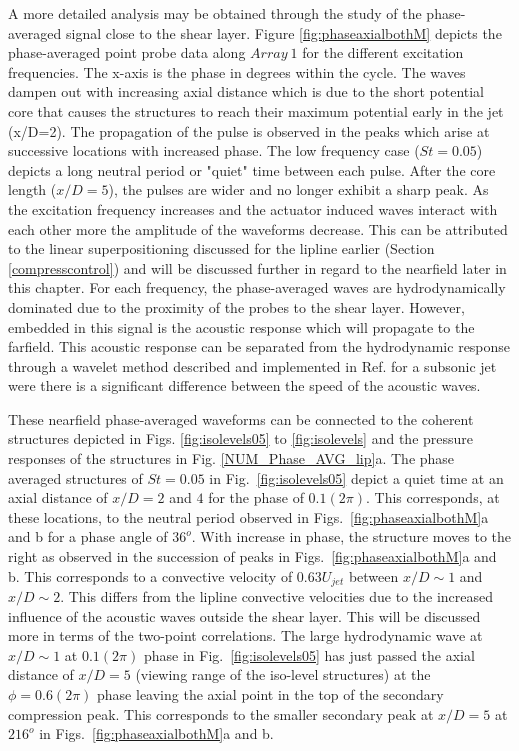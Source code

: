 \documentclass[english]{aiaa-tc}
\begin{document}
A more detailed analysis may be obtained through the study of the phase-averaged signal close to the shear layer.
Figure \ref{fig:phaseaxialbothM} depicts the phase-averaged point probe data along $Array~1$ for the different excitation frequencies. The x-axis is the phase in degrees within the cycle. The waves dampen out with increasing axial distance which is due to the short potential core that causes the structures to reach their maximum potential early in the jet (x/D=2). %
The propagation of the pulse is observed in the peaks which arise at
successive locations with increased phase. The low frequency case
($St=0.05$) depicts a long neutral period or "quiet" time between each
pulse. After the core length ($x/D=5$), the pulses are wider and no
longer exhibit a sharp peak.
As the excitation frequency increases and the actuator induced waves interact with each other more the amplitude of the waveforms decrease. This can be attributed to the linear superpositioning discussed for the lipline earlier (Section \ref{compresscontrol}) and will be discussed further in regard to the nearfield later in this chapter. 
For each frequency, the phase-averaged waves are hydrodynamically dominated due to the proximity of the probes to the shear layer. However, embedded in this signal is the acoustic response which will propagate to the farfield. This acoustic response can be separated from the hydrodynamic response through a wavelet method described and implemented in Ref. \cite{Crawley2015} for a subsonic jet were there is a significant difference between the speed of the acoustic waves.  

These nearfield phase-averaged waveforms can be connected to the coherent structures depicted in Figs. \ref{fig:isolevels05} to \ref{fig:isolevels} and the pressure responses of the structures in Fig. \ref{NUM_Phase_AVG_lip}a.
The phase averaged structures of $St=0.05$ in
Fig.~\ref{fig:isolevels05} depict a quiet time at an axial distance of $x/D=2$
and $4$ for the phase of $0.1(2\pi)$. This corresponds, at these
locations, to the neutral period observed in Figs.~\ref{fig:phaseaxialbothM}a and b for
a phase angle of $36^o$.  With increase in phase, the structure moves
to the right as observed in the succession of peaks in
Figs.~\ref{fig:phaseaxialbothM}a and b.  This corresponds to a convective
velocity of $0.63U_{jet}$ between $x/D\sim 1$ and $x/D\sim 2$. This differs from the lipline convective velocities due to the increased influence of the acoustic waves outside the shear layer. This will be discussed more in terms of the two-point correlations.
The large hydrodynamic wave at $x/D\sim 1$ at
$0.1(2\pi)$ phase in Fig.~\ref{fig:isolevels05} has just passed the axial
distance of $x/D=5$ (viewing range of the iso-level structures) at the
$\phi=0.6(2\pi)$ phase leaving the axial point in the top of the secondary compression peak. This corresponds to the smaller secondary peak at
$x/D=5$ at $216^o$ in Figs.~\ref{fig:phaseaxialbothM}a and b.
\end{document}
